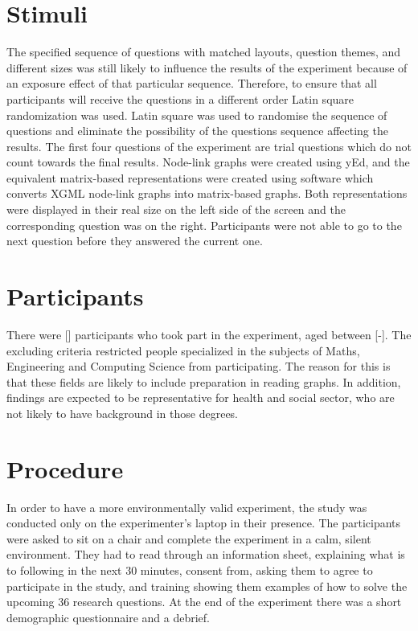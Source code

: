 \documentclass{l4proj}
\begin{document}
\section{Stimuli}
The specified sequence of questions with matched layouts, question themes, and different sizes was still likely to influence the results of the experiment because of an exposure effect of that particular sequence. Therefore, to ensure that all participants will receive the questions in a different order Latin square randomization was used. Latin square was used to randomise the sequence of questions and eliminate the possibility of the questions sequence affecting the results. The first four questions of the experiment are trial questions which do not count towards the final results. 
Node-link graphs were created using yEd, and the equivalent matrix-based representations were created using software which converts XGML node-link graphs into matrix-based graphs. Both representations were displayed in their real size on the left side of the screen and the corresponding question was on the right. Participants were not able to go to the next question before they answered the current one.

\section{Participants}
There were [] participants who took part in the experiment, aged between [-]. The excluding criteria restricted people specialized in the subjects of Maths, Engineering and Computing Science from participating. The reason for this is that these fields are likely to include preparation in reading graphs. In addition, findings are expected to be representative for health and social sector, who are not likely to have background in those degrees.

\section{Procedure}

In order to have a more environmentally valid experiment, the study was conducted only on the experimenter's laptop in their presence. The participants were asked to sit on a chair and complete the experiment in a calm, silent environment. They had to read through an information sheet, explaining what is to following in the next 30 minutes, consent from, asking them to agree to participate in the study, and training showing them examples of how to solve the upcoming 36 research questions. At the end of the experiment there was a short demographic questionnaire and a debrief.
\end{document}

